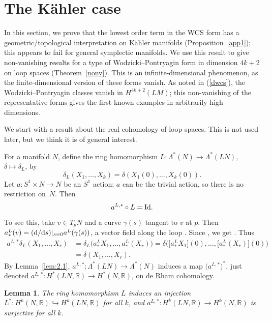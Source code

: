 \documentclass[pdftex]{sigma}
\numberwithin{equation}{section}
\newtheorem{Lemma}[Theorem]{Lemma}
\theoremstyle{definition}
\newcommand{\BbR}{{\mathbb R}}
\newcommand{\R}{\BbR}
\begin{document}
\section{The K\"ahler case}\label{section5}

In this section, we prove that the lowest order term in the WCS form has
a geometric/topological interpretation on
K\"ahler manifolds (Proposition~\ref{app1}); this appears to fail for general symplectic manifolds. We use this result to give non-vanishing results for a type of Wodzicki--Pontryagin form in dimension $4k+2$ on loop spaces (Theorem~\ref{nonv}).
This is an infinite-dimensional phenomenon, as the finite-dimensional version of these forms vanish.
As noted in (\ref{dwcs}), the Wodzicki--Pontryagin classes vanish in
$H^{4k+2}(LM)$; this non-vanishing of the representative forms gives the first known examples in arbitrarily high dimensions.

We start with a result about the real cohomology of loop spaces. This is not used later, but we think it is of general interest.

For a manifold $N$, define the ring homomorphism $L\colon \Lambda^*(N)\to \Lambda^*(LN)$, $ \delta\mapsto \delta_L$, by
\[\delta_L(X_1,\dots,X_{k}) = \delta(X_1(0),\dots, X_{k}(0)).\]
Let $a\colon S^1\times N\to N$ be an $S^1$ action; $a$ can be the trivial action, so there is no restriction on~$N$. Then
\begin{equation}\label{ident}a^{L,*}\circ L = {\rm Id}.
\end{equation}
To see this, take $v\in T_pN$ and a curve $\gamma(s)$ tangent to $v$ at $p$. Then $a^L_{*}(v)
= ({\rm d}/{\rm d}s)|_{s=0} a^L(\gamma(s))$, a vector field along the loop . Since , we get . Thus
\begin{align*}a^{L,*}\delta_L(X_1,\dots, X_{r}) &= \delta_L\bigl(a^L_{*}X_1,\dots,a^L_{*}(X_{r})\bigr) = \delta
\bigl(\bigl[a^L_{*}X_1\bigr](0),\dots,\bigl[a^L_{*}(X_{r})\bigr](0)\bigr)\\
&= \delta(X_1,\dots,X_r).
\end{align*}
By Lemma~\ref{lem:2.1}, $a^{L,*}\colon \Lambda^*(LN) \to \Lambda^*(N)$ induces a map $\bigl(a^{L,*}\bigr)^*$, just denoted
$a^{L,*}\colon H^*(LN,\R)\to H^*(N,\R)$, on de Rham cohomology.

\begin{Lemma}
The ring homomorphism $L$ induces an injection $L^*\colon H^k(N,\R)\hookrightarrow H^k(LN,\R)$ for all $k$, and
$a^{L,*}\colon H^k(LN,\R)\to H^k(N,\R)$ is surjective for all $k$.
\end{Lemma}
\end{document}
